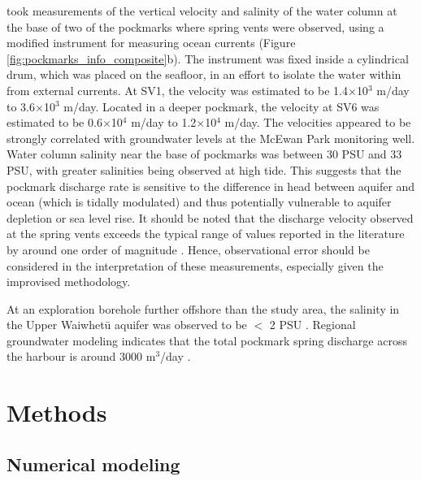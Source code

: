 \documentclass[draft, 10pt]{agujournal2019}
\begin{document}
 took measurements of the vertical velocity and salinity of the water column at the base of two of the pockmarks where spring vents were observed,
using a modified instrument for measuring ocean currents (Figure \ref{fig:pockmarks_info_composite}b).
The instrument was fixed inside a cylindrical drum, which was placed on the seafloor, in an effort to isolate the water within from external currents.
At SV1, the velocity was estimated to be 1.4$\times$10$^3$ m/day to 3.6$\times$10$^3$ m/day. Located in a deeper pockmark, the velocity at SV6 was estimated to be 0.6$\times$10$^4$ m/day to 1.2$\times$10$^4$ m/day.
The velocities appeared to be strongly correlated with groundwater levels at the McEwan Park monitoring well.
Water column salinity near the base of pockmarks was between 30 PSU and 33 PSU, with greater salinities being observed at high tide.
This suggests that the pockmark discharge rate is sensitive to the difference in head between aquifer and ocean (which is tidally modulated) and thus potentially vulnerable to aquifer depletion or sea level rise.
It should be noted that the discharge velocity observed at the spring vents exceeds the typical range of values reported in the literature by around one order of magnitude \cite{diego-feliu_combining_2025}.
Hence, observational error should be considered in the interpretation of these measurements, especially given the improvised methodology.

At an exploration borehole further offshore than the study area, the salinity in the Upper Waiwhetū aquifer was observed to be $<$ 2 PSU \cite{gyopari_wellington_2018}.
Regional groundwater modeling indicates that the total pockmark spring discharge across the harbour is around 3000 m$^3$/day \cite{bennett_hutt_2024}.

\section{Methods}\label{methods}

\subsection{Numerical modeling}
\end{document}
